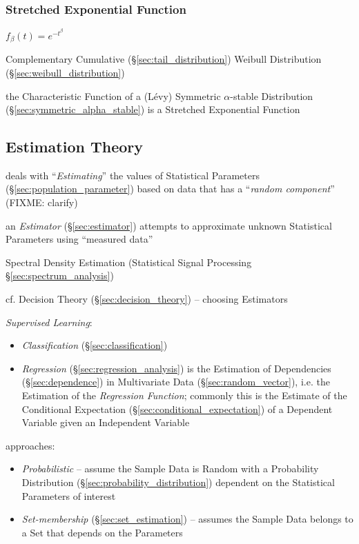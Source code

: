 \subsubsection{Stretched Exponential Function}\label{sec:stretched_exponential}

$f_\beta(t) = e^{-t^\beta}$

Complementary Cumulative (\S\ref{sec:tail_distribution}) Weibull
Distribution (\S\ref{sec:weibull_distribution})

the Characteristic Function of a (L\'evy) Symmetric $\alpha$-stable Distribution
(\S\ref{sec:symmetric_alpha_stable}) is a Stretched Exponential Function



\subsection{Estimation Theory}\label{sec:estimation_theory}

deals with ``\emph{Estimating}'' the values of Statistical Parameters
(\S\ref{sec:population_parameter}) based on data that has a ``\emph{random
  component}'' (FIXME: clarify)

an \emph{Estimator} (\S\ref{sec:estimator}) attempts to approximate unknown
Statistical Parameters using ``measured data''

\fist Spectral Density Estimation (Statistical Signal Processing
\S\ref{sec:spectrum_analysis})

\fist cf. Decision Theory (\S\ref{sec:decision_theory}) -- choosing Estimators

\fist \emph{Supervised Learning}:
\begin{itemize}
  \item \emph{Classification} (\S\ref{sec:classification})
  \item \emph{Regression} (\S\ref{sec:regression_analysis}) is the Estimation of
    Dependencies (\S\ref{sec:dependence}) in Multivariate Data
    (\S\ref{sec:random_vector}), i.e. the Estimation of the \emph{Regression
      Function}; commonly this is the Estimate of the Conditional Expectation
    (\S\ref{sec:conditional_expectation}) of a Dependent Variable given an
    Independent Variable
\end{itemize}

approaches:
\begin{itemize}
  \item \emph{Probabilistic} -- assume the Sample Data is Random with a
    Probability Distribution (\S\ref{sec:probability_distribution}) dependent on
    the Statistical Parameters of interest
  \item \emph{Set-membership} (\S\ref{sec:set_estimation}) -- assumes the
    Sample Data belongs to a Set that depends on the Parameters
\end{itemize}

